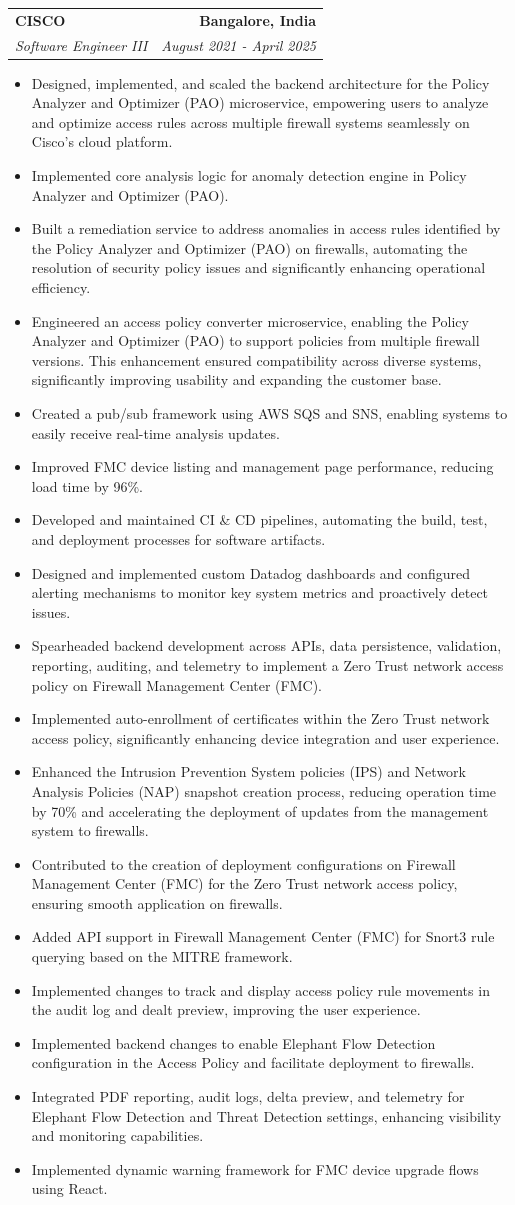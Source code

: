 \documentclass[letterpaper,11pt]{article}
\makeatletter
\newcommand{\resumeItem}[1]{
  \item\small{
    {#1 \vspace{-2pt}}
  }
}
\newcommand{\resumeSubheading}[4]{
  \vspace{-2pt}\item
    \begin{tabular*}{1.0\textwidth}[t]{l@{\extracolsep{\fill}}r}
      \textbf{#1} & \textbf{\small #2} \\
      \textit{\small#3} & \textit{\small #4} \\
    \end{tabular*}\vspace{-7pt}
}
\newcommand{\resumeItemListStart}{\begin{itemize}}
\newcommand{\resumeItemListEnd}{\end{itemize}\vspace{-5pt}}
\makeatother
\begin{document}
\resumeSubheading
{CISCO}{Bangalore, India}
{Software Engineer III}{August 2021 - April 2025}
\resumeItemListStart
\resumeItem{Designed, implemented, and scaled the backend architecture for the Policy Analyzer and Optimizer (PAO) microservice, empowering users to analyze and optimize access rules across multiple firewall systems seamlessly on Cisco’s cloud platform.}
\resumeItem{Implemented core analysis logic for anomaly detection engine in Policy Analyzer and Optimizer (PAO).}
\resumeItem{Built a remediation service to address anomalies in access rules identified by the Policy Analyzer and Optimizer (PAO) on firewalls, automating the resolution of security policy issues and significantly enhancing operational efficiency.}
\resumeItem{Engineered an access policy converter microservice, enabling the Policy Analyzer and Optimizer (PAO) to support policies from multiple firewall versions. This enhancement ensured compatibility across diverse systems, significantly improving usability and expanding the customer base.}
\resumeItem{Created a pub/sub framework using AWS SQS and SNS, enabling systems to easily receive real-time analysis updates.}
\resumeItem{Improved FMC device listing and management page performance, reducing load time by 96\%.}
\resumeItem{Developed and maintained CI \& CD  pipelines, automating the build, test, and deployment processes for software artifacts.}
\resumeItem{Designed and implemented custom Datadog dashboards and configured alerting mechanisms to monitor key system metrics and proactively detect issues.}
\resumeItem{Spearheaded backend development across APIs, data persistence, validation, reporting, auditing, and telemetry to implement a Zero Trust network access policy on Firewall Management Center (FMC).}
\resumeItem{Implemented auto-enrollment of certificates within the Zero Trust network access policy, significantly enhancing device integration and user experience.}
\resumeItem{Enhanced the Intrusion Prevention System policies (IPS) and Network Analysis Policies (NAP) snapshot creation process, reducing operation time by 70\% and accelerating the deployment of updates from the management system to firewalls.}
\resumeItem{Contributed to the creation of deployment configurations on Firewall Management Center (FMC) for the Zero Trust network access policy, ensuring smooth application on firewalls.}

\resumeItem{Added API support in Firewall Management Center (FMC) for Snort3 rule querying based on the MITRE framework.}
\resumeItem{Implemented changes to track and display access policy rule movements in the audit log and dealt preview, improving the user experience.}
\resumeItem{Implemented backend changes to enable Elephant Flow Detection configuration in the Access Policy and facilitate deployment to firewalls.}
\resumeItem{Integrated PDF reporting, audit logs, delta preview, and telemetry for Elephant Flow Detection and Threat Detection settings, enhancing visibility and monitoring capabilities.}
\resumeItem{Implemented dynamic warning framework for FMC device upgrade flows using React.}
\resumeItemListEnd
\end{document}
